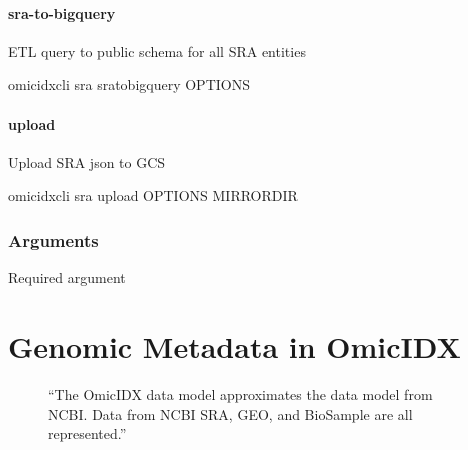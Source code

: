 \documentclass[letterpaper,10pt,english]{sphinxmanual}
\begin{document}
\paragraph{sra-to-bigquery}
\label{\detokenize{cli:omicidx-cli-sra-sra-to-bigquery}}
ETL query to public schema for all SRA entities

\begin{sphinxVerbatim}[commandchars=\\\{\}]
omicidx\PYGZhy{}cli sra sra\PYGZhy{}to\PYGZhy{}bigquery \PYG{o}{[}OPTIONS\PYG{o}{]}
\end{sphinxVerbatim}


\paragraph{upload}
\label{\detokenize{cli:omicidx-cli-sra-upload}}
Upload SRA json to GCS

\begin{sphinxVerbatim}[commandchars=\\\{\}]
omicidx\PYGZhy{}cli sra upload \PYG{o}{[}OPTIONS\PYG{o}{]} MIRRORDIR
\end{sphinxVerbatim}
\subsubsection*{Arguments}

\begin{fulllineitems}
\label{\detokenize{cli:cmdoption-omicidx-cli-sra-upload-arg-mirrordir}}
Required argument

\end{fulllineitems}



\section{Genomic Metadata in OmicIDX}
\label{\detokenize{genomic_metadata:genomic-metadata-in-omicidx}}\label{\detokenize{genomic_metadata::doc}}
\begin{figure}[htbp]
\centering
\capstart

\caption{“The OmicIDX data model approximates the data model from NCBI. Data from NCBI SRA, GEO, and BioSample are all represented.”}\label{\detokenize{genomic_metadata:datamodel}}\end{figure}
\end{document}
